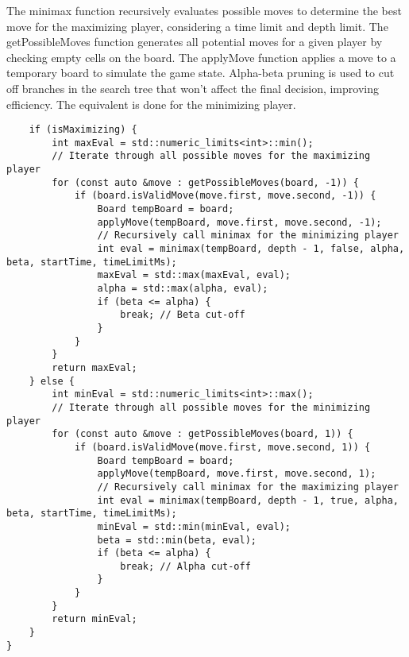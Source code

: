 \documentclass[a4paper,12pt]{article}
\begin{document}
The minimax function recursively evaluates possible moves to determine the best move for the maximizing player, considering a time limit and depth limit. The getPossibleMoves function generates all potential moves for a given player by checking empty cells on the board. The applyMove function applies a move to a temporary board to simulate the game state. Alpha-beta pruning is used to cut off branches in the search tree that won't affect the final decision, improving efficiency. The equivalent is done for the 
minimizing player.
\begin{verbatim}
    if (isMaximizing) {
        int maxEval = std::numeric_limits<int>::min();
        // Iterate through all possible moves for the maximizing player
        for (const auto &move : getPossibleMoves(board, -1)) {
            if (board.isValidMove(move.first, move.second, -1)) {
                Board tempBoard = board;
                applyMove(tempBoard, move.first, move.second, -1);
                // Recursively call minimax for the minimizing player
                int eval = minimax(tempBoard, depth - 1, false, alpha, beta, startTime, timeLimitMs);
                maxEval = std::max(maxEval, eval);
                alpha = std::max(alpha, eval);
                if (beta <= alpha) {
                    break; // Beta cut-off
                }
            }
        }
        return maxEval;
    } else {
        int minEval = std::numeric_limits<int>::max();
        // Iterate through all possible moves for the minimizing player
        for (const auto &move : getPossibleMoves(board, 1)) {
            if (board.isValidMove(move.first, move.second, 1)) {
                Board tempBoard = board;
                applyMove(tempBoard, move.first, move.second, 1);
                // Recursively call minimax for the maximizing player
                int eval = minimax(tempBoard, depth - 1, true, alpha, beta, startTime, timeLimitMs);
                minEval = std::min(minEval, eval);
                beta = std::min(beta, eval);
                if (beta <= alpha) {
                    break; // Alpha cut-off
                }
            }
        }
        return minEval;
    }
}
\end{verbatim}
\end{document}
